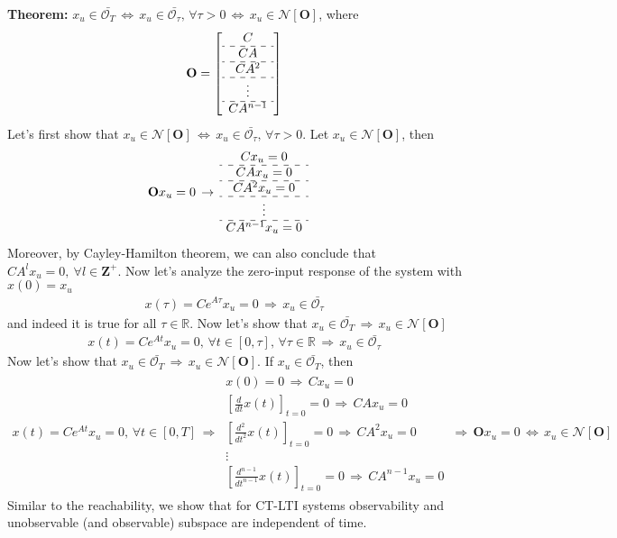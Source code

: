 \documentclass[twoside]{article}
\begin{document}
\textbf{Theorem:} $x_u \in \bar{\mathcal{O}_T} \, \iff \, 
x_u \in \bar{\mathcal{O}_{\tau}} , \, \forall \tau > 0 \, \iff \, 
x_u \in \mathcal{N}[ \mathbf{O} ]$, where 
%
\begin{align*}
  \mathbf{O} = \left[ 
  \begin{array}{c}
    C 
    \\ \hdashline
    C A 
    \\ \hdashline
    C A^2
    \\ \hdashline
    \vdots
    \\ \hdashline
    C A^{n-1}
  \end{array}
  \right]
\end{align*}
%
Let's first show that $x_u \in \mathcal{N}[ \mathbf{O} ] \, \iff \, x_u \in \bar{\mathcal{O}_{\tau}} , \, \forall \tau > 0$. Let $x_u \in \mathcal{N}[ \mathbf{O} ]$, then  
%
\begin{align*}
  \mathbf{O} x_u &= 0
  \, 
    \rightarrow
  \,
  \begin{array}{c}
    C x_u = 0
    \\ \hdashline
    C A x_u = 0
    \\ \hdashline
    C A^2 x_u = 0
    \\ \hdashline
    \vdots
    \\ \hdashline
    C A^{n-1} x_u = 0
  \end{array}
\end{align*}
%
Moreover, by Cayley-Hamilton theorem, we can also conclude that $C A^{l} x_u = 0, \ \forall l \in \mathbf{Z}^+$. Now let's analyze the zero-input response of the system with $x(0) = x_u$
%
\begin{align*}
  x(\tau) = C e^{A \tau} x_u = 0 \, \Rightarrow \, x_u \in \bar{\mathcal{O}_{\tau}}
\end{align*}
%
and indeed it is true for all $\tau \in \mathbb{R}$. Now let's 
show that $x_u \in \bar{\mathcal{O}_T} \, \Rightarrow \, x_u \in \mathcal{N}[ \mathbf{O} ]$
%
\begin{align*}
  x(t) = C e^{A t} x_u = 0 , \, 
  \forall t \in [0,\tau] , \, \forall 
  \tau \in \mathbb{R} \, \Rightarrow \, x_u \in \bar{\mathcal{O}_{\tau}}
\end{align*}
%
Now let's show that $x_u \in \bar{\mathcal{O}_T} \, \Rightarrow \, 
x_u \in \mathcal{N}[ \mathbf{O} ]$. If $x_u \in \bar{\mathcal{O}_T}$, then 
%
\begin{align*}
  x(t) = C e^{A t} x_u = 0 , \, \forall t \in [0,T] \, 
  \Rightarrow \, \begin{array}{c} 
  x(0) = 0 \, \Rightarrow \, C x_u = 0
  \\
  \left[\frac{d}{dt}x(t) \right]_{t=0} = 0 \, \Rightarrow \, C A x_u = 0
  \\
  \left[\frac{d^2}{dt^2}x(t) \right]_{t=0} = 0 \, \Rightarrow \, C A^2 x_u = 0
  \\
  \vdots
  \\
  \left[\frac{d^{n-1}}{dt^{n-1}}x(t) \right]_{t=0} = 0 \, \Rightarrow \, C A^{n-1} x_u = 0
  \end{array}
  \, \Rightarrow \, \mathbf{O} x_u = 0 
  \, \iff \, x_u \in \mathcal{N}[ \mathbf{O} ]
\end{align*}
%
Similar to the reachability, we show that for CT-LTI systems
observability and unobservable (and observable) subspace
are independent of time. 


\end{document}
